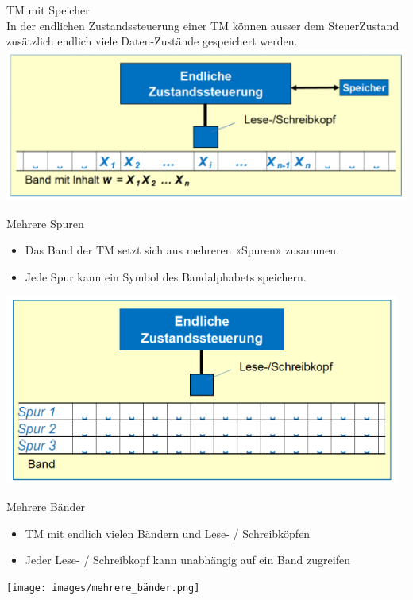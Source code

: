 \begin{concept}{TM mit Speicher}\\
    In der endlichen Zustandssteuerung einer TM können ausser dem SteuerZustand zusätzlich endlich viele Daten-Zustände gespeichert werden.\\
    \includegraphics[width=0.3\linewidth]{images/tm_mit_speicher.png}
\end{concept}

\begin{concept}{Mehrere Spuren}
    \begin{itemize}
        \item Das Band der TM setzt sich aus mehreren «Spuren» zusammen.
        \item Jede Spur kann ein Symbol des Bandalphabets speichern.
    \end{itemize}
    \includegraphics[width=0.3\linewidth]{images/mehrere_spuren.png}
\end{concept}

\begin{concept}{Mehrere Bänder}
    \begin{itemize}
        \item TM mit endlich vielen Bändern und Lese- / Schreibköpfen
        \item Jeder Lese- / Schreibkopf kann unabhängig auf ein Band zugreifen
    \end{itemize}
    \texttt{[image: images/mehrere\_bänder.png]}
\end{concept}

